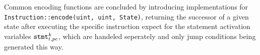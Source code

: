 \noindent
Common encoding functions are concluded by introducing implementations for \lstinline[style=c++, basicstyle=\normalsize\ttfamily]{Instruction::encode(uint, uint, State)}, returning the successor of a given state after executing the specific instruction expect for the statement activation variables $\texttt{stmt}^k_{t, pc}$, which are handeled seperately and only jump conditions being generated this way.

\newpage


\newcommand{\defencode}[1]{
  \par\noindent
  #1
  \par\noindent
  \rule[0.5\baselineskip]{\textwidth}{0.1pt}%
}

\newlength{\encodeskip}
\setlength{\encodeskip}{.5\baselineskip}


